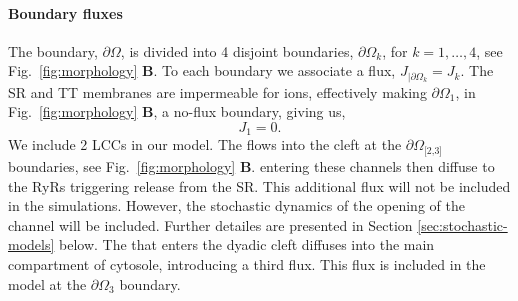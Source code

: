 \paragraph*{Boundary fluxes}

The boundary, $\partial\Omega$, is divided into 4 disjoint boundaries, $\partial\Omega_k$, for $k=1,\ldots,4$, see Fig.~\ref{fig:morphology} \textbf{B}. To each boundary we associate a flux, $J_{|\partial\Omega_k}=J_k$. The SR and TT membranes are impermeable for ions, effectively making $\partial\Omega_{\scriptscriptstyle\text{1}}$, in Fig.~\ref{fig:morphology} \textbf{B}, a no-flux boundary, giving us,
\begin{equation}
  \label{eq:no-flux}
  J_{\scriptscriptstyle 1}= 0.
\end{equation}
We include 2 LCCs in our model. The \Ca flows into the cleft at the $\partial\Omega_{\scriptscriptstyle\text{[2,3]}}$ boundaries, see Fig.~\ref{fig:morphology} \textbf{B}. \Ca entering these channels then diffuse to the RyRs triggering \Ca release from the SR. This additional \Ca flux will not be included in the simulations. However, the stochastic dynamics of the opening of the channel will be included. Further detailes are presented in Section \ref{sec:stochastic-models} below. The \Ca that enters the dyadic cleft diffuses into the main compartment of cytosole, introducing a third flux. This flux is included in the model at the $\partial\Omega_{\scriptscriptstyle\text{3}}$ boundary.\par

